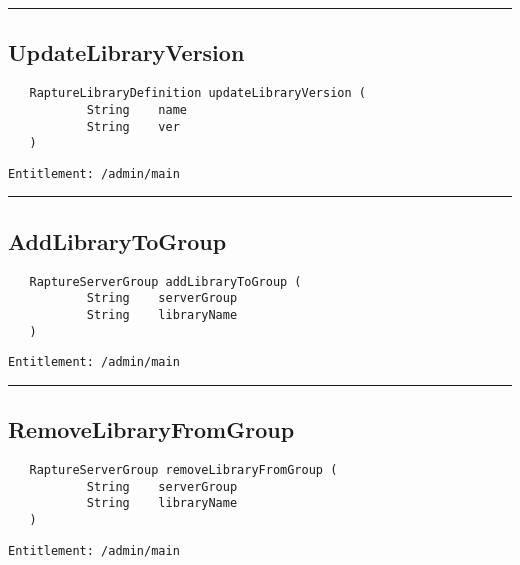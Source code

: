 \rule{12cm}{2pt}
\subsection{UpdateLibraryVersion}
\label{Api:UpdateLibraryVersion}
\begin{verbatim}
   RaptureLibraryDefinition updateLibraryVersion (
           String    name
           String    ver
   )
\end{verbatim}
\begin{Verbatim}[fontsize=\small, formatcom=\color{Maroon}]
  Entitlement: /admin/main
\end{Verbatim}



\rule{12cm}{2pt}
\subsection{AddLibraryToGroup}
\label{Api:AddLibraryToGroup}
\begin{verbatim}
   RaptureServerGroup addLibraryToGroup (
           String    serverGroup
           String    libraryName
   )
\end{verbatim}
\begin{Verbatim}[fontsize=\small, formatcom=\color{Maroon}]
  Entitlement: /admin/main
\end{Verbatim}



\rule{12cm}{2pt}
\subsection{RemoveLibraryFromGroup}
\label{Api:RemoveLibraryFromGroup}
\begin{verbatim}
   RaptureServerGroup removeLibraryFromGroup (
           String    serverGroup
           String    libraryName
   )
\end{verbatim}
\begin{Verbatim}[fontsize=\small, formatcom=\color{Maroon}]
  Entitlement: /admin/main
\end{Verbatim}



